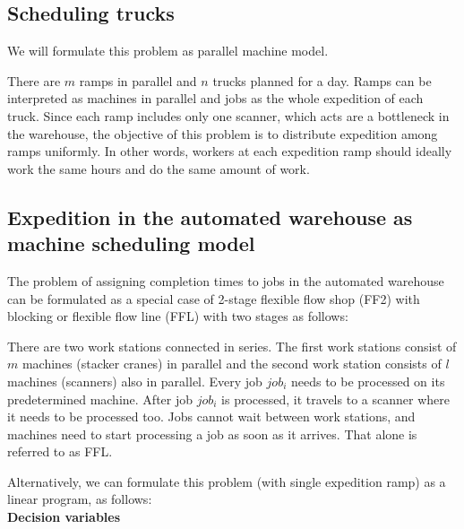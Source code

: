 \documentclass{ctuthesis}
\begin{document}
 \subsection{Scheduling trucks}
 
 We will formulate this problem as parallel machine model.
 
 There are $m$ ramps in parallel and $n$ trucks planned for a day. Ramps can be interpreted as machines in parallel and jobs as the whole expedition of each truck. Since each ramp includes only one scanner, which acts are a bottleneck in the warehouse, the objective of this problem is to distribute expedition among ramps uniformly. In other words, workers at each expedition ramp should ideally work the same hours and do the same amount of work.
 
\subsection{Expedition in the automated warehouse as machine scheduling model}

The problem of assigning completion times to jobs in the automated warehouse can be formulated as a special case of 2-stage flexible flow shop (FF2) with blocking or flexible flow line (FFL) with two stages as follows:

There are two work stations connected in series. The first work stations consist of $m$ machines (stacker cranes) in parallel and the second work station consists of $l$ machines (scanners) also in parallel. Every job $job_i$ needs to be processed on its predetermined machine. After job $job_i$ is processed, it travels to a scanner where it needs to be processed too. Jobs cannot wait between work stations, and machines need to start processing a job as soon as it arrives. That alone is referred to as FFL.

Alternatively, we can formulate this problem (with single expedition ramp) as a linear program, as follows:\\
\textbf{Decision variables}
\end{document}
